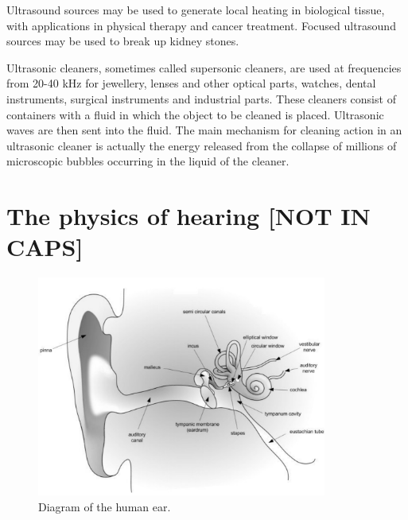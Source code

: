 \label{m38800*id185154}Ultrasound sources may be used to generate local heating in biological tissue, with applications in physical therapy and cancer treatment. Focused ultrasound sources may be used to break up kidney stones.\par 
      \label{m38800*id185159}Ultrasonic cleaners, sometimes called supersonic cleaners, are used at frequencies from 20-40 kHz for jewellery, lenses and other optical parts, watches, dental instruments, surgical instruments and industrial parts.
These cleaners consist of containers with a fluid in which the object to be cleaned is placed. Ultrasonic waves are then sent into the fluid. The main mechanism for cleaning action in an ultrasonic cleaner is actually the energy released from the collapse of millions of microscopic bubbles occurring in the liquid of the cleaner.\par 
\label{m38800*notfhsst!!!underscore!!!id482}


\section*{The physics of hearing [NOT IN CAPS]}
            \nopagebreak
\begin{figure}[h]
\begin{center}
\includegraphics[width=0.85\textwidth]{HumanEar-GrayScale.pdf}
\end{center}
\caption{Diagram of the human ear. }
\label{Human Ear}
\end{figure}


